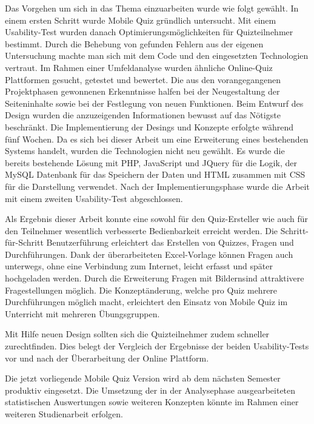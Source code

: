 Das Vorgehen um sich in das Thema einzuarbeiten wurde wie folgt gewählt. In einem ersten Schritt wurde Mobile Quiz gründlich untersucht. Mit einem \gls{Usability-Test} wurden danach Optimierungsmöglichkeiten für Quizteilnehmer bestimmt. Durch die Behebung von gefunden Fehlern aus der eigenen Untersuchung machte man sich mit dem Code und den eingesetzten Technologien vertraut. Im Rahmen einer Umfeldanalyse wurden ähnliche Online-Quiz Plattformen gesucht, getestet und bewertet. Die aus den vorangegangenen Projektphasen gewonnenen Erkenntnisse halfen bei der Neugestaltung der Seiteninhalte sowie bei der Festlegung von neuen Funktionen. Beim Entwurf des Design wurden die anzuzeigenden Informationen bewusst auf das Nötigste beschränkt. Die Implementierung der Desings und Konzepte erfolgte während fünf Wochen. Da es sich bei dieser Arbeit um eine Erweiterung eines bestehenden Systems handelt, wurden die Technologien nicht neu gewählt. Es wurde die bereits bestehende Lösung mit PHP, JavaScript und JQuery für die Logik, der MySQL Datenbank für das Speichern der Daten und HTML zusammen mit CSS für die Darstellung verwendet. Nach der Implementierungsphase wurde die Arbeit mit einem zweiten \gls{Usability-Test} abgeschlossen.

\bigskip

Als Ergebnis dieser Arbeit konnte eine sowohl für den Quiz-Ersteller wie auch für den Teilnehmer wesentlich verbesserte Bedienbarkeit erreicht werden. Die Schritt-für-Schritt Benutzerführung erleichtert das Erstellen von Quizzes, Fragen und Durchführungen. Dank der überarbeiteten Excel-Vorlage können Fragen auch unterwegs, ohne eine Verbindung zum Internet, leicht erfasst und später hochgeladen werden. Durch die Erweiterung \glqq Fragen mit Bildern\grqq sind attraktivere Fragestellungen möglich. Die Konzeptänderung, welche pro Quiz mehrere Durchführungen möglich macht, erleichtert den Einsatz von Mobile Quiz im Unterricht mit mehreren Übungsgruppen. 

Mit Hilfe neuen Design sollten sich die Quizteilnehmer zudem schneller zurechtfinden. Dies belegt der Vergleich der Ergebnisse der beiden \gls{Usability-Test}s vor und nach der Überarbeitung der Online Plattform. 

\bigskip

Die jetzt vorliegende Mobile Quiz Version wird ab dem nächsten Semester produktiv eingesetzt. Die Umsetzung der in der Analysephase ausgearbeiteten statistischen Auswertungen sowie weiteren Konzepten könnte im Rahmen einer weiteren Studienarbeit erfolgen.